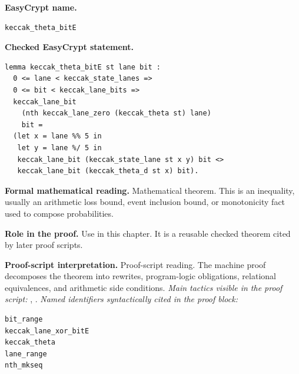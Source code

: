 \begin{formaltheorem}
\noindent\textbf{EasyCrypt name.}
\begin{lstlisting}[language=EasyCrypt,basicstyle=\ttfamily\scriptsize]
keccak_theta_bitE
\end{lstlisting}
\noindent\textbf{Checked EasyCrypt statement.}
\begin{lstlisting}[language=EasyCrypt,basicstyle=\ttfamily\scriptsize]
lemma keccak_theta_bitE st lane bit :
  0 <= lane < keccak_state_lanes =>
  0 <= bit < keccak_lane_bits =>
  keccak_lane_bit
    (nth keccak_lane_zero (keccak_theta st) lane)
    bit =
  (let x = lane %% 5 in
   let y = lane %/ 5 in
   keccak_lane_bit (keccak_state_lane st x y) bit <>
   keccak_lane_bit (keccak_theta_d st x) bit).
\end{lstlisting}
\noindent\textbf{Formal mathematical reading.}
Mathematical theorem. This is an inequality, usually an arithmetic loss bound, event inclusion bound, or monotonicity fact used to compose probabilities.

\noindent\textbf{Role in the proof.}
Use in this chapter. It is a reusable checked theorem cited by later proof scripts.

\noindent\textbf{Proof-script interpretation.}
Proof-script reading. The machine proof decomposes the theorem into rewrites, program-logic obligations, relational equivalences, and arithmetic side conditions.
\emph{Main tactics visible in the proof script:} , .
\emph{Named identifiers syntactically cited in the proof block:}
\begin{lstlisting}[language=EasyCrypt,basicstyle=\ttfamily\scriptsize]
bit_range
keccak_lane_xor_bitE
keccak_theta
lane_range
nth_mkseq
\end{lstlisting}

\end{formaltheorem}

